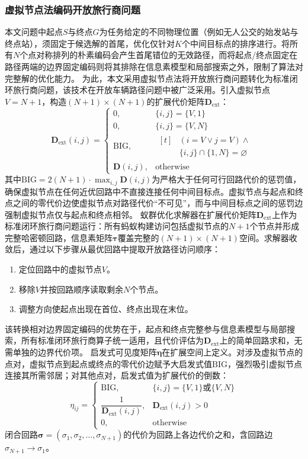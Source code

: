 \documentclass[lettersize,journal]{IEEEtran}
\begin{document}
\subsubsection{虚拟节点法编码开放旅行商问题}
\label{subsec:virtual}
本文问题中起点$S$与终点$G$为任务给定的不同物理位置（例如无人公交的始发站与终点站），须固定于候选解的首尾，优化仅针对$K$个中间目标点的排序进行。将所有$N$个点对称排列的朴素编码会产生首尾错位的无效路径，而将起点/终点固定在路径两端的边界固定编码则将其排除在信息素模型和局部搜索之外，限制了算法对完整解的优化能力。
为此，本文采用虚拟节点法将开放旅行商问题转化为标准闭环旅行商问题，该技术在开放车辆路径问题中被广泛采用\textcolor{blue}{\cite{ref32}}。引入虚拟节点$V = N + 1$，构造$(N+1) \times (N+1)$的扩展代价矩阵$\mathbf{D}_{\mathrm{ext}}$：
\begin{equation}
\mathbf{D}_{\mathrm{ext}}(i, j) =
\begin{cases}
0, & \{i, j\} = \{V, 1\} \\
0, & \{i, j\} = \{V, N\} \\
\mathrm{BIG}, & \begin{aligned}[t]
& (i = V \lor j = V) \land \\
& \{i, j\} \cap \{1, N\} = \varnothing
\end{aligned} \\
\mathbf{D}(i, j), & \text{otherwise}
\end{cases}
\label{eq:dext}
\end{equation}
其中$\mathrm{BIG} = 2(N+1) \cdot \max_{i,j} \mathbf{D}(i,j)$为严格大于任何可行回路代价的惩罚值，确保虚拟节点在任何近优回路中不直接连接任何中间目标点。虚拟节点与起点和终点之间的零代价边使虚拟节点对路径代价``不可见''，而与中间目标点之间的惩罚边强制虚拟节点仅与起点和终点相邻。
蚁群优化求解器在扩展代价矩阵$\mathbf{D}_{\mathrm{ext}}$上作为标准闭环旅行商问题运行：所有蚂蚁构建访问包括虚拟节点的$N+1$个节点并形成完整哈密顿回路，信息素矩阵$\bm{\tau}$覆盖完整的$(N+1) \times (N+1)$空间。求解器收敛后，通过以下步骤从最优回路中提取开放路径访问顺序：
\begin{enumerate}
\item 定位回路中的虚拟节点$V$。
\item 移除$V$并按回路顺序读取剩余$N$个节点。
\item 调整方向使起点出现在首位、终点出现在末位。
\end{enumerate}
该转换相对边界固定编码的优势在于，起点和终点完整参与信息素模型与局部搜索，所有标准闭环旅行商算子统一适用，且代价评估为$\mathbf{D}_{\mathrm{ext}}$上的简单回路求和，无需单独的边界代价项。
启发式可见度矩阵$\bm{\eta}$在扩展空间上定义。对涉及虚拟节点的点对，虚拟节点到起点或终点的零代价边赋予大启发式值$\mathrm{BIG}$，强烈吸引虚拟节点连接其所需邻居；对其他点对，启发式值为扩展代价的倒数：
\begin{equation}
\eta_{ij} =
\begin{cases}
\mathrm{BIG}, & \{i, j\} = \{V, 1\} \text{或} \{V, N\} \\
\dfrac{1}{\mathbf{D}_{\mathrm{ext}}(i,j)}, & \mathbf{D}_{\mathrm{ext}}(i,j) > 0 \\
0, & \text{otherwise}
\end{cases}
\label{eq:eta}
\end{equation}
闭合回路$\bm{\sigma} = (\sigma_1, \sigma_2, \dots, \sigma_{N+1})$的代价为回路上各边代价之和，含回路边$\sigma_{N+1} \to \sigma_1$。
\end{document}
